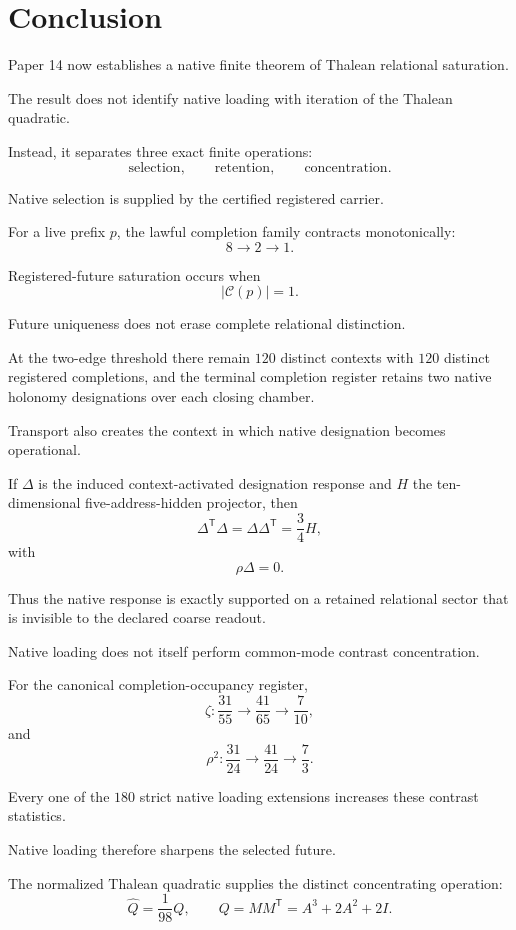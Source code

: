 \section{Conclusion}

Paper 14 now establishes a native finite theorem of Thalean relational
saturation.

The result does not identify native loading with iteration of the
Thalean quadratic.

Instead, it separates three exact finite operations:
\[
\text{selection},
\qquad
\text{retention},
\qquad
\text{concentration}.
\]

Native selection is supplied by the certified registered carrier.

For a live prefix \(p\), the lawful completion family contracts
monotonically:
\[
8\longrightarrow2\longrightarrow1.
\]

Registered-future saturation occurs when
\[
|\mathcal C(p)|=1.
\]

Future uniqueness does not erase complete relational distinction.

At the two-edge threshold there remain \(120\) distinct contexts with
\(120\) distinct registered completions, and the terminal completion
register retains two native holonomy designations over each closing
chamber.

Transport also creates the context in which native designation becomes
operational.

If \(\Delta\) is the induced context-activated designation response
and \(H\) the ten-dimensional five-address-hidden projector, then
\[
\Delta^{\mathsf T}\Delta
=
\Delta\Delta^{\mathsf T}
=
\frac34H,
\]
with
\[
\rho\Delta=0.
\]

Thus the native response is exactly supported on a retained relational
sector that is invisible to the declared coarse readout.

Native loading does not itself perform common-mode contrast
concentration.

For the canonical completion-occupancy register,
\[
\zeta:
\frac{31}{55}
\longrightarrow
\frac{41}{65}
\longrightarrow
\frac{7}{10},
\]
and
\[
\rho^2:
\frac{31}{24}
\longrightarrow
\frac{41}{24}
\longrightarrow
\frac73.
\]

Every one of the \(180\) strict native loading extensions increases
these contrast statistics.

Native loading therefore sharpens the selected future.

The normalized Thalean quadratic supplies the distinct concentrating
operation:
\[
\widehat Q=\frac1{98}Q,
\qquad
Q=MM^{\mathsf T}=A^3+2A^2+2I.
\]

